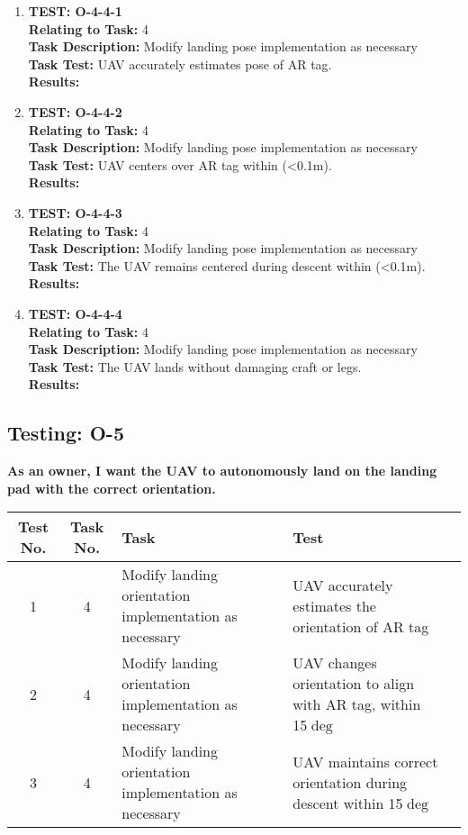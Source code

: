 \begin{enumerate}
\item \textbf{TEST: O-4-4-1}\\
\textbf{Relating to Task:} 4\\
\textbf{Task Description:} Modify landing pose implementation as necessary\\
\textbf{Task Test:} UAV accurately estimates pose of AR tag.\\
\textbf{Results:} 

\item \textbf{TEST: O-4-4-2}\\
\textbf{Relating to Task:} 4\\
\textbf{Task Description:} Modify landing pose implementation as necessary\\
\textbf{Task Test:} UAV centers over AR tag within (\textless 0.1m).\\
\textbf{Results:} 

\item \textbf{TEST: O-4-4-3}\\
\textbf{Relating to Task:} 4\\
\textbf{Task Description:} Modify landing pose implementation as necessary\\
\textbf{Task Test:} The UAV remains centered during descent within (\textless 0.1m).\\
\textbf{Results:} 

\item \textbf{TEST: O-4-4-4}\\
\textbf{Relating to Task:} 4\\
\textbf{Task Description:} Modify landing pose implementation as necessary\\
\textbf{Task Test:} The UAV lands without damaging craft or legs.\\
\textbf{Results:} 
\end{enumerate}


\subsection{Testing: O-5}
\textbf{As an owner, I want the UAV to autonomously land on the landing pad with the correct orientation.}\\
\begin{tabular}{| c | c | >{\raggedright}m{4cm} | m{4cm} | c |}\hline
	Test No. & Task No. & Task & Test \\\hline
		1 & 4 & Modify landing orientation implementation as necessary & UAV accurately estimates the orientation of AR tag\\ \hline
		2 & 4 & Modify landing orientation implementation as necessary & UAV changes orientation to align with AR tag, within 15$\deg$ \\ \hline
		3 & 4 & Modify landing orientation implementation as necessary & UAV maintains correct orientation during descent within 15$\deg$ \\ \hline
\end{tabular}

